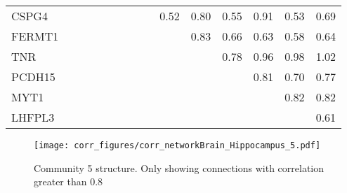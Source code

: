 \begin{longtable}{lrrrrrrrrrrrrrr}
CSPG4   &              &            &              &               &             &             &              &             &         0.52 &      0.80 &         0.55 &       0.91 &         0.53 &        0.69 \\
FERMT1  &              &            &              &               &             &             &              &             &              &      0.83 &         0.66 &       0.63 &         0.58 &        0.64 \\
TNR     &              &            &              &               &             &             &              &             &              &           &         0.78 &       0.96 &         0.98 &        1.02 \\
PCDH15  &              &            &              &               &             &             &              &             &              &           &              &       0.81 &         0.70 &        0.77 \\
MYT1    &              &            &              &               &             &             &              &             &              &           &              &            &         0.82 &        0.82 \\
LHFPL3  &              &            &              &               &             &             &              &             &              &           &              &            &              &        0.61 \\
\end{longtable}


\begin{figure}[h!]
\centering
\texttt{[image: corr\_figures/corr\_networkBrain\_Hippocampus\_5.pdf]}
\caption{Community 5 structure. Only showing connections with correlation greater than 0.8}
\end{figure}




